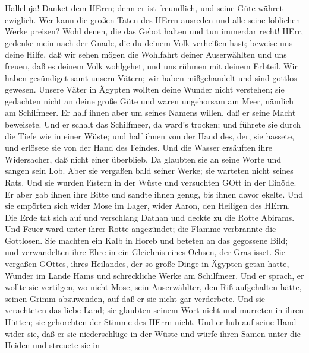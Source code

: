  Halleluja! Danket dem HErrn; denn er ist freundlich, und
seine Güte währet ewiglich.  Wer kann die großen Taten des
HErrn ausreden und alle seine löblichen Werke preisen?  Wohl
denen, die das Gebot halten und tun immerdar recht!  HErr,
gedenke mein nach der Gnade, die du deinem Volk verheißen hast; beweise
uns deine Hilfe,  daß wir sehen mögen die Wohlfahrt deiner
Auserwählten und uns freuen, daß es deinem Volk wohlgehet, und uns
rühmen mit deinem Erbteil.  Wir haben gesündiget samt unsern
Vätern; wir haben mißgehandelt und sind gottlos gewesen. 
Unsere Väter in Ägypten wollten deine Wunder nicht verstehen; sie
gedachten nicht an deine große Güte und waren ungehorsam am Meer,
nämlich am Schilfmeer.  Er half ihnen aber um seines Namens
willen, daß er seine Macht beweisete.  Und er schalt das
Schilfmeer, da ward's trocken; und führete sie durch die Tiefe wie in
einer Wüste;  und half ihnen von der Hand des, der, sie
hassete, und erlösete sie von der Hand des Feindes.  Und
die Wasser ersäuften ihre Widersacher, daß nicht einer überblieb.
 Da glaubten sie an seine Worte und sangen sein Lob.
 Aber sie vergaßen bald seiner Werke; sie warteten nicht
seines Rats.  Und sie wurden lüstern in der Wüste und
versuchten GOtt in der Einöde.  Er aber gab ihnen ihre
Bitte und sandte ihnen genug, bis ihnen davor ekelte.  Und
sie empörten sich wider Mose im Lager, wider Aaron, den Heiligen des
HErrn.  Die Erde tat sich auf und verschlang Dathan und
deckte zu die Rotte Abirams.  Und Feuer ward unter ihrer
Rotte angezündet; die Flamme verbrannte die Gottlosen.  Sie
machten ein Kalb in Horeb und beteten an das gegossene Bild;
 und verwandelten ihre Ehre in ein Gleichnis eines Ochsen,
der Gras isset.  Sie vergaßen GOttes, ihres Heilandes, der
so große Dinge in Ägypten getan hatte,  Wunder im Lande
Hams und schreckliche Werke am Schilfmeer.  Und er sprach,
er wollte sie vertilgen, wo nicht Mose, sein Auserwählter, den Riß
aufgehalten hätte, seinen Grimm abzuwenden, auf daß er sie nicht gar
verderbete.  Und sie verachteten das liebe Land; sie
glaubten seinem Wort nicht  und murreten in ihren Hütten;
sie gehorchten der Stimme des HErrn nicht.  Und er hub auf
seine Hand wider sie, daß er sie niederschlüge in der Wüste
 und würfe ihren Samen unter die Heiden und streuete sie in
